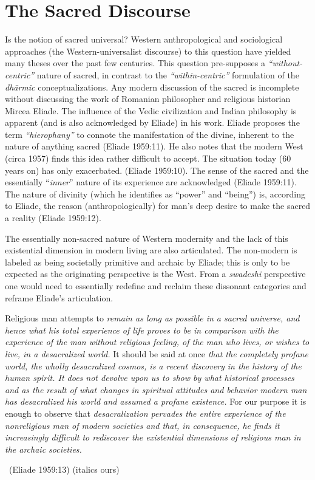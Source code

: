 \section*{The Sacred Discourse}

Is the notion of sacred universal? Western anthropological and sociological approaches (the Western-universalist discourse) to this question have yielded many theses over the past few centuries. This question pre-supposes a \textit{“without-centric”} nature of sacred, in contrast to the \textit{“within-centric”} formulation of the \textit{dhārmic} conceptualizations. Any modern discussion of the sacred is incomplete without discussing the work of Romanian philosopher and religious historian Mircea Eliade. The influence of the Vedic civilization and Indian philosophy is apparent (and is also acknowledged by Eliade) in his work. Eliade proposes the term \textit{“hierophany”} to connote the manifestation of the divine, inherent to the nature of anything sacred (Eliade 1959:11). He also notes that the modern West (circa 1957) finds this idea rather difficult to accept. The situation today (60 years on) has only exacerbated. (Eliade 1959:10). The sense of the sacred and the essentially “\textit{inner}” nature of its experience are acknowledged (Eliade 1959:11). The nature of divinity (which he identifies as “power” and “being”) is, according to Eliade, the reason (anthropologically) for man's deep desire to make the sacred a reality (Eliade 1959:12).

The essentially non-sacred nature of Western modernity and the lack of this existential dimension in modern living are also articulated. The non-modern is labeled as being societally primitive and archaic by Eliade; this is only to be expected as the originating perspective is the West. From a \textit{swadeshi} perspective one would need to essentially redefine and reclaim these dissonant categories and reframe Eliade's articulation.

\begin{myquote}
Religious man attempts to \textit{remain as long as possible in a sacred universe, and hence what his total experience of life proves to be in comparison with the experience of the man without religious feeling, of the man who lives, or wishes to live, in a desacralized world.} It should be said at once \textit{that the completely profane world, the wholly desacralized cosmos, is a recent discovery in the history of the human spirit. It does not devolve upon us to show by what historical processes and as the result of what changes in spiritual attitudes and behavior modern man has desacralized his world and assumed a profane existence.} For our purpose it is enough to observe that \textit{desacralization pervades the entire experience of the nonreligious man of modern societies and that, in consequence, he finds it increasingly difficult to rediscover the existential dimensions of religious man in the archaic societies.} 

~\hfill (Eliade 1959:13) (italics ours)
\end{myquote}

